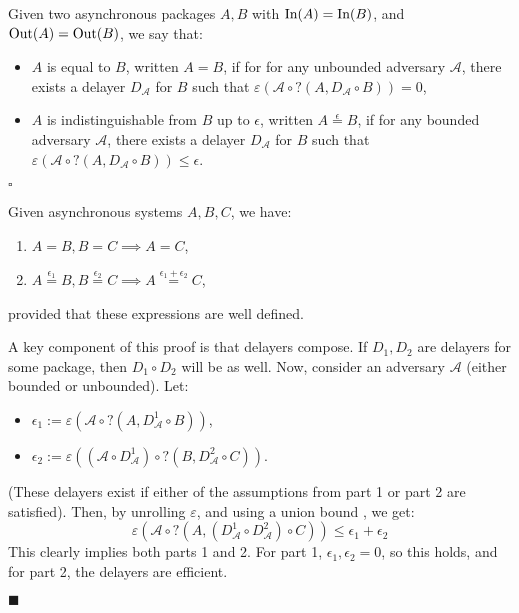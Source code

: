 \begin{definition}
  Given two asynchronous packages $A, B$ with $\text{In}(A) = \text{In}(B)$,
  and $\text{Out}(A) = \text{Out}(B)$, we say that:
  \begin{itemize}
    \item $A$ is equal to $B$, written $A = B$, if for for any unbounded adversary $\mathcal{A}$,
    there exists a delayer $D_{\mathcal{A}}$ for $B$ such that $\varepsilon(\mathcal{A} \circ ?(A, D_{\mathcal{A}} \circ B)) = 0$,
    \item $A$ is indistinguishable from $B$ up to $\epsilon$, written $A \overset{\epsilon}{=} B$,
    if for any bounded adversary $\mathcal{A}$,
    there exists a delayer $D_{\mathcal{A}}$ for $B$ such that $\varepsilon(\mathcal{A} \circ ?(A, D_{\mathcal{A}} \circ B)) \leq \epsilon$.
  \end{itemize}

  $\square$
\end{definition}

\begin{lemma}
  Given asynchronous systems $A, B, C$, we have:
  \begin{enumerate}
    \item $A = B, B = C \implies A = C$,
    \item $A \overset{\epsilon_1}{=} B, B \overset{\epsilon_2}{=} C \implies A \overset{\epsilon_1 + \epsilon_2}{=} C$,
  \end{enumerate}
  provided that these expressions are well defined.

   A key component of this proof is that delayers compose.
  If $D_1, D_2$ are delayers for some package, then $D_1 \circ D_2$ will
  be as well.
  Now, consider an adversary $\mathcal{A}$ (either bounded or unbounded).
  Let:
  \begin{itemize}
    \item $\epsilon_1 := \varepsilon(\mathcal{A} \circ ?(A, D^1_\mathcal{A} \circ B))$,
    \item $\epsilon_2 := \varepsilon((\mathcal{A} \circ D^1_{\mathcal{A}})\circ ?(B, D^2_\mathcal{A} \circ C))$.
  \end{itemize}
  (These delayers exist if either of the assumptions from part 1 or part 2 are satisfied).
  Then, by unrolling $\varepsilon$, and using a union bound ,
  we get:
  $$
  \varepsilon(\mathcal{A} \circ ?(A, (D^1_{\mathcal{A}} \circ D^2_{\mathcal{A}}) \circ C)) \leq \epsilon_1 + \epsilon_2
  $$
  This clearly implies both parts 1 and 2.
  For part 1, $\epsilon_1, \epsilon_2 = 0$, so this holds,
  and for part 2, the delayers are efficient.

  $\blacksquare$
\end{lemma}

